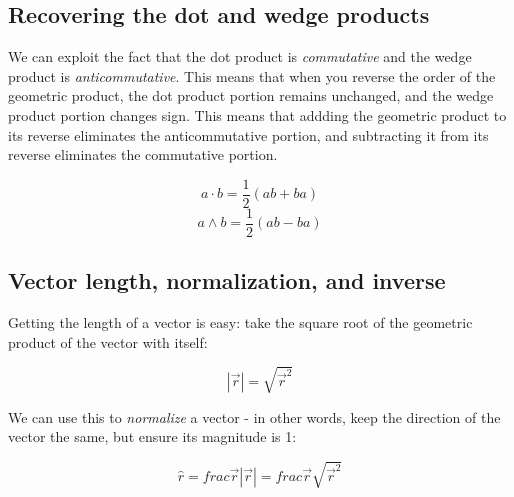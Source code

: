 \subsection{Recovering the dot and wedge products}

We can exploit the fact that the dot product is \textit{commutative} and the wedge product is
\textit{anticommutative}. This means that when you reverse the order of the geometric product, the
dot product portion remains unchanged, and the wedge product portion changes sign. This means that
addding the geometric product to its reverse eliminates the anticommutative portion, and 
subtracting it from its reverse eliminates the commutative portion.

$$ a \cdot b = \frac{1}{2}\left(ab + ba\right)$$
$$ a \wedge b = \frac{1}{2}\left(ab - ba\right)$$

\subsection{Vector length, normalization, and inverse}

Getting the length of a vector is easy: take the square root of the geometric product of the vector
with itself:

$$\left|\vec{r}\right| = \sqrt{\vec{r}^2}$$

We can use this to \textit{normalize} a vector - in other words, keep the direction of the vector 
the same, but ensure its magnitude is 1:

$$\hat{r} = frac{\vec{r}}{\left|\vec{r}\right|} = frac{\vec{r}}{\sqrt{\vec{r}^2}}$$
